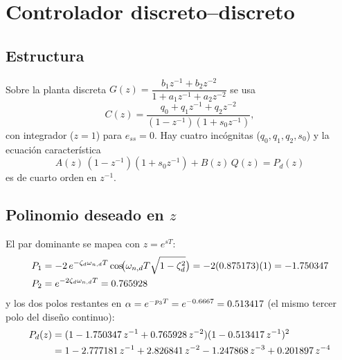 \documentclass[11pt,letterpaper]{article}
\begin{document}
\section{Controlador discreto--discreto}

\subsection{Estructura}
Sobre la planta discreta
$G(z) = \dfrac{b_1 z^{-1} + b_2 z^{-2}}{1 + a_1 z^{-1} + a_2 z^{-2}}$ se usa
\begin{equation}
  C(z) = \frac{q_0 + q_1 z^{-1} + q_2 z^{-2}}{(1 - z^{-1})(1 + s_0 z^{-1})},
\end{equation}
con integrador ($z=1$) para $e_{ss}=0$. Hay cuatro incógnitas
($q_0,q_1,q_2,s_0$) y la ecuación característica
\begin{equation}
  A(z)\,(1 - z^{-1})(1 + s_0 z^{-1}) + B(z)\,Q(z) = P_d(z)
  \label{eq:diofantica}
\end{equation}
es de cuarto orden en $z^{-1}$.

\subsection{Polinomio deseado en $z$}
El par dominante se mapea con $z = e^{sT}$:
\begin{align}
  P_1 &= -2\,e^{-\zeta_d\omega_{n,d}T}\cos\!\bigl(\omega_{n,d}T\sqrt{1-\zeta_d^2}\bigr)
       = -2(0.875173)(1) = -1.750347\\
  P_2 &= e^{-2\zeta_d\omega_{n,d}T} = 0.765928
\end{align}
y los dos polos restantes en $\alpha = e^{-p_3 T} = e^{-0.6667} = 0.513417$
(el mismo tercer polo del diseño continuo):
\begin{align}
  P_d(z) &= (1 -1.750347\,z^{-1} + 0.765928\,z^{-2})(1 - 0.513417\,z^{-1})^2 \nonumber\\
         &= 1 -2.777181\,z^{-1} + 2.826841\,z^{-2} -1.247868\,z^{-3} + 0.201897\,z^{-4}
\end{align}
\end{document}
